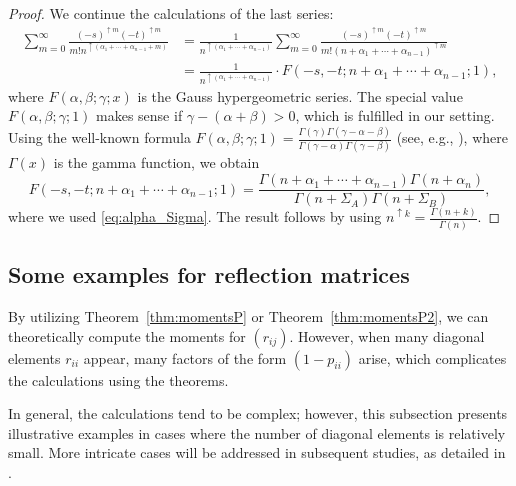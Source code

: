 \documentclass[pdftex]{sigma}
\numberwithin{equation}{section}
\theoremstyle{definition}
\begin{document}
\begin{proof}
We continue the calculations of the last series:
\begin{align*}
\sum_{m=0}^\infty \frac{(-s)^{\uparrow m}(-t)^{\uparrow m}}{m! n^{\uparrow (\alpha_1+ \cdots+ \alpha_{n-1}+m)}}
&=\frac{1}{n^{\uparrow (\alpha_1+\cdots+ \alpha_{n-1})}}
 \sum_{m=0}^\infty \frac{(-s)^{\uparrow m}(-t)^{\uparrow m}}{m! (n+\alpha_1+ \cdots+ \alpha_{n-1})^{\uparrow m}} \\
 &= \frac{1}{n^{\uparrow (\alpha_1+\cdots+ \alpha_{n-1})}} \cdot
 F(-s,-t;n+\alpha_1+ \cdots+ \alpha_{n-1};1),
\end{align*}
where $F(\alpha,\beta;\gamma;x)$ is the Gauss hypergeometric series.
The special value $F(\alpha,\beta;\gamma;1)$ makes sense if $\gamma-(\alpha+\beta)>0$, which is fulfilled in our setting.
Using the well-known formula $F(\alpha,\beta;\gamma;1)= \frac{\Gamma(\gamma) \Gamma(\gamma-\alpha-\beta)}{\Gamma(\gamma-\alpha)\Gamma(\gamma-\beta)}$ (see, e.g., \cite[Theorem 2.2.2]{AAR}),
where $\Gamma(x)$ is the gamma function,
we obtain
\[
F(-s,-t;n+\alpha_1+ \cdots+ \alpha_{n-1};1)
= \frac{\Gamma(n+\alpha_1+\cdots+\alpha_{n-1})\Gamma (n+\alpha_n)}{\Gamma(n+\Sigma_A) \Gamma(n+\Sigma_B)},
\]
where we used \eqref{eq:alpha_Sigma}.
The result follows by using $n^{\uparrow k}=\frac{\Gamma(n+k)}{\Gamma(n)}$.
\end{proof}

\subsection{Some examples for reflection matrices}

By utilizing Theorem~\ref{thm:momentsP} or Theorem~\ref{thm:momentsP2}, we can theoretically compute the moments for $(r_{ij})$.
However, when many diagonal elements $r_{ii}$ appear, many factors of the form $(1 - p_{ii})$ arise, which complicates the calculations using the theorems.

In general, the calculations tend to be complex; however, this subsection presents illustrative examples in cases where the number of diagonal elements is relatively small.
More intricate cases will be addressed in subsequent studies, as detailed in \cite{CardinCollinsMatsumoto}.
\end{document}
